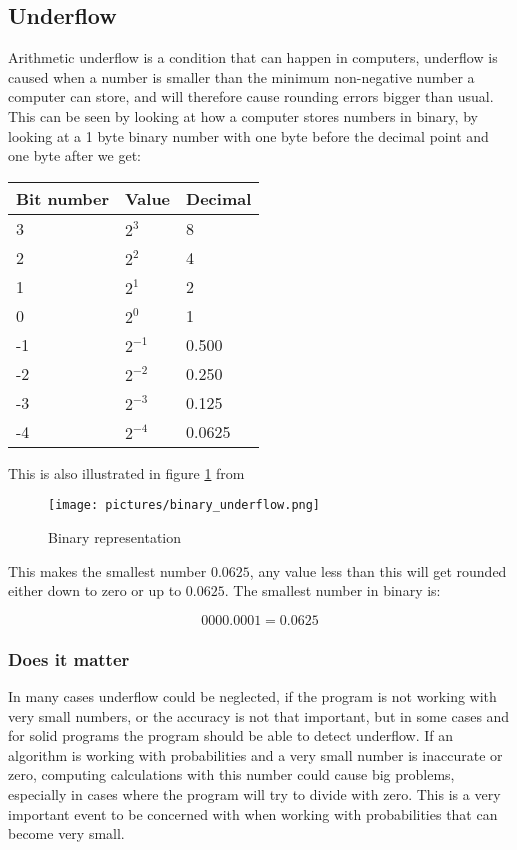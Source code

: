 \subsection{Underflow}
    Arithmetic underflow is a condition that can happen in computers, underflow is caused when a number is smaller than the minimum non-negative number a computer can store, and will therefore cause rounding errors bigger than usual. This can be seen by looking at how a computer stores numbers in binary, by looking at a 1 byte binary number with one byte before the decimal point and one byte after we get:\\

\begin{table}[!h]
    \begin{tabular}{|l|l|l|}
        \hline
        Bit number & Value    & Decimal \\ \hline
        3          & $2^3$    & 8       \\ 
        2          & $2^2$    & 4       \\ 
        1          & $2^1$    & 2       \\ 
        0          & $2^0$    & 1       \\ 
        -1         & $2^{-1}$ & 0.500   \\ 
        -2         & $2^{-2}$ & 0.250   \\ 
        -3         & $2^{-3}$ & 0.125   \\ 
        -4         & $2^{-4}$ & 0.0625  \\
        \hline
    \end{tabular}
\end{table}

This is also illustrated in figure \ref{fig:binary_underflow} from \cite{IEEEArithmetic}

	\begin{figure}
		\centering
		\texttt{[image: pictures/binary\_underflow.png]}
		\caption{Binary representation}
		\label{fig:binary_underflow}
	\end{figure}


    This makes the smallest number $0.0625$, any value less than this will get rounded either down to zero or up to $0.0625$. The smallest number in binary is:

    $$0000.0001 = 0.0625$$

\subsubsection{Does it matter}
In many cases underflow could be neglected, if the program is not working with very small numbers, or the accuracy is not that important, but in some cases and for solid programs the program should be able to detect underflow. If an algorithm is working with probabilities and a very small number is inaccurate or zero, computing calculations with this number could cause big problems, especially in cases where the program will try to divide with zero. This is a very important event to be concerned with when working with probabilities that can become very small.  

